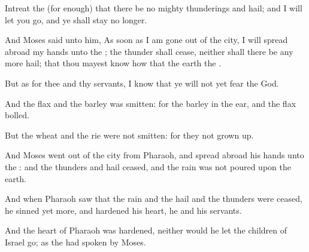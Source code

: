 {Intreat the
{} (for
{}
enough) that there be no
{}
mighty
thunderings and
hail; and I will let you
go, and ye shall
stay no
longer.

And
Moses
said unto him, As soon as I am gone
out of the
city, I will spread
abroad my
hands unto the
{};
{} the
thunder shall
cease, neither shall there be any more
hail; that thou mayest
know how that the
earth
{} the
{}.

But as for thee and thy
servants, I
know that ye will not yet
fear the
{}
God.

And the
flax and the
barley was
smitten: for the
barley
{} in the
ear, and the
flax
{}
bolled.

But the
wheat and the
rie were not
smitten: for
they
{} not grown
up.

And
Moses went
out of the
city from
Pharaoh, and spread
abroad his
hands unto the
{}: and the
thunders and
hail
ceased, and the
rain was not
poured upon the
earth.

And when
Pharaoh
saw that the
rain and the
hail and the
thunders were
ceased, he
sinned yet
more, and
hardened his
heart, he and his
servants.

And the
heart of
Pharaoh was
hardened, neither would he let the
children of
Israel
go; as the
{} had
spoken
by
Moses.




\par }
